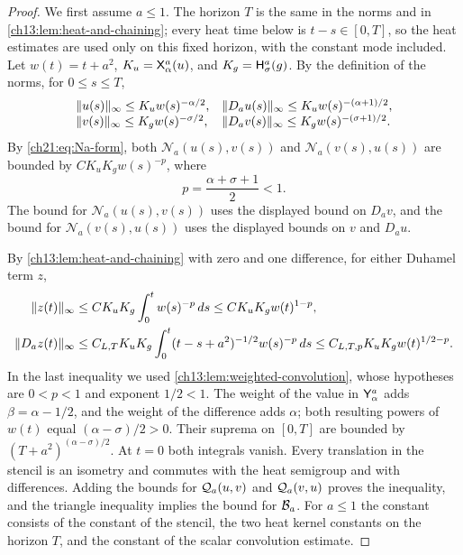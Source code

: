 \begin{proof}
We first assume $a\le1$. The horizon $T$ is the same in the norms and in \cref{ch13:lem:heat-and-chaining}; every heat time below is $t-s\in[0,T]$, so the heat estimates are used only on this fixed horizon, with the constant mode included. Let $w(t)=t+a^2$, $K_u=\mathsf X_{\alpha}^{a}(u)$, and $K_g=\mathsf H_{\sigma}^{a}(g)$. By the definition of the norms, for $0\le s\le T$,
\[
 \begin{array}{ll}
 \lVert u(s)\rVert_\infty\le K_uw(s)^{-\alpha/2},&\lVert D_au(s)\rVert_\infty\le K_uw(s)^{-(\alpha+1)/2},\\
 \lVert v(s)\rVert_\infty\le K_gw(s)^{-\sigma/2},&\lVert D_av(s)\rVert_\infty\le K_gw(s)^{-(\sigma+1)/2}.
 \end{array}
\]
By \eqref{ch21:eq:Na-form}, both $\mathcal N_a(u(s),v(s))$ and $\mathcal N_a(v(s),u(s))$ are bounded by $CK_uK_gw(s)^{-p}$, where
\[
 p=\frac{\alpha+\sigma+1}{2}<1 .
\]
The bound for $\mathcal N_a(u(s),v(s))$ uses the displayed bound on $D_av$, and the bound for $\mathcal N_a(v(s),u(s))$ uses the displayed bounds on $v$ and $D_au$.

By \cref{ch13:lem:heat-and-chaining} with zero and one difference, for either Duhamel term $z$,
\[
 \begin{split}
 \lVert z(t)\rVert_\infty&\le CK_uK_g\int_0^tw(s)^{-p}\,ds\le CK_uK_gw(t)^{1-p},\\
 \lVert D_az(t)\rVert_\infty&\le C_{L,T}K_uK_g\int_0^t(t-s+a^2)^{-1/2}w(s)^{-p}\,ds\le C_{L,T,p}K_uK_gw(t)^{1/2-p}.
 \end{split}
\]
In the last inequality we used \cref{ch13:lem:weighted-convolution}, whose hypotheses are $0<p<1$ and exponent $1/2<1$. The weight of the value in $\mathsf Y_{\alpha}^{a}$ adds $\beta=\alpha-1/2$, and the weight of the difference adds $\alpha$; both resulting powers of $w(t)$ equal $(\alpha-\sigma)/2>0$. Their suprema on $[0,T]$ are bounded by $(T+a^2)^{(\alpha-\sigma)/2}$. At $t=0$ both integrals vanish. Every translation in the stencil is an isometry and commutes with the heat semigroup and with differences. Adding the bounds for $\mathcal Q_{a}(u,v)$ and $\mathcal Q_{a}(v,u)$ proves the inequality, and the triangle inequality implies the bound for $\mathcal B_{a}$. For $a\le1$ the constant consists of the constant of the stencil, the two heat kernel constants on the horizon $T$, and the constant of the scalar convolution estimate.


\end{proof}
